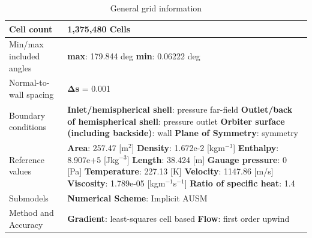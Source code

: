 \begin{table}[H]
\caption{General grid information}
	\centering
	\begin{tabular}{|l|p{4.5in}|} \hline
		Cell count & 1,375,480 Cells  \\ \hline
		Min/max included angles & \textbf{max}: 179.844 deg \textbf{min}: 0.06222 deg \\ \hline
		Normal-to-wall spacing & $\boldsymbol{\Delta}$\textbf{s} = 0.001 \\ \hline
		Boundary conditions & \textbf{Inlet/hemispherical shell}: pressure far-field \newline \textbf{Outlet/back of hemispherical shell}: pressure outlet \newline \textbf{Orbiter surface (including backside)}: wall \newline \textbf{Plane of Symmetry}: symmetry \\ \hline
		Reference values & \textbf{Area}: 257.47 [m$^2$] \newline \textbf{Density}: 1.672e-2 [kgm$^{-3}$] \newline \textbf{Enthalpy}: 8.907e+5 [Jkg$^{-3}$] \textbf{Length}: 38.424 [m] \newline \textbf{Gauage pressure}: 0 [Pa] \newline \textbf{Temperature}: 227.13 [K] \newline \textbf{Velocity}: 1147.86 [m/s] \newline \textbf{Viscosity}: 1.789e-05 [kgm$^{-1}$s$^{-1}$] \newline \textbf{Ratio of specific heat}: 1.4 \\ \hline
		Submodels & \textbf{Numerical Scheme}: Implicit AUSM \\ \hline
		Method and Accuracy & \textbf{Gradient}: least-squares cell based \newline \textbf{Flow}: first order upwind \\ \hline
	\end{tabular}
\end{table}
